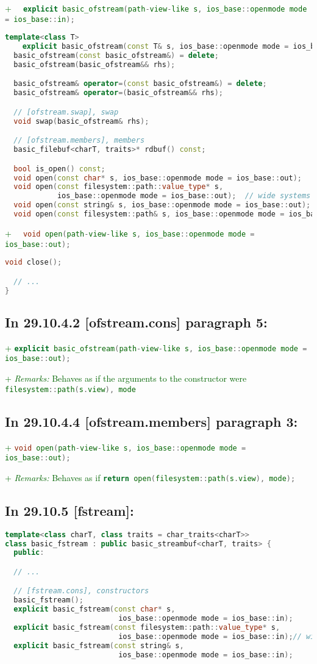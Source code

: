 \documentclass[11pt]{article}
\newcommand{\code}[2][cpp]{\lstinline[language=#1,basicstyle=\small\ttfamily]{#2}}
\newcommand{\desc}[1]{\textit{#1}}
\newcommand{\remarks}{\desc{Remarks: }}
\newcommand{\tsrefp}[3]{\subsection*{In #2 \textbf{[#1]} paragraph #3:}}
\newcommand{\tsref}[2]{\subsection*{In #2 \textbf{[#1]}:}}
\newcommand{\tsreplace}[3]{\textcolor{red}{\sout{#1}}#2\textcolor{darkgreen}{#3}}
\begin{document}
\tsreplace{}{}{+ \code{  explicit basic_ofstream(path-view-like s,
ios_base::openmode mode = ios_base::in);}}

\begin{lstlisting}[language=cpp]
  template<class T>
    explicit basic_ofstream(const T& s, ios_base::openmode mode = ios_base::in);
  basic_ofstream(const basic_ofstream&) = delete;
  basic_ofstream(basic_ofstream&& rhs);

  basic_ofstream& operator=(const basic_ofstream&) = delete;
  basic_ofstream& operator=(basic_ofstream&& rhs);

  // [ofstream.swap], swap
  void swap(basic_ofstream& rhs);

  // [ofstream.members], members
  basic_filebuf<charT, traits>* rdbuf() const;

  bool is_open() const;
  void open(const char* s, ios_base::openmode mode = ios_base::out);
  void open(const filesystem::path::value_type* s,
            ios_base::openmode mode = ios_base::out);  // wide systems only; see [fstream.syn]
  void open(const string& s, ios_base::openmode mode = ios_base::out);
  void open(const filesystem::path& s, ios_base::openmode mode = ios_base::out);
\end{lstlisting}

\tsreplace{}{}{+ \code{  void open(path-view-like s, ios_base::openmode mode = ios_base::out);}}

\begin{lstlisting}[language=cpp]
  void close();

  // ...
}
\end{lstlisting}


\tsrefp{ofstream.cons}{29.10.4.2}{5}

\tsreplace{}{}{+ \code{explicit basic_ofstream(path-view-like s,
ios_base::openmode mode = ios_base::out);}}

\tsreplace{}{}{+ \remarks Behaves as if the arguments to the constructor were \code{filesystem::path(s.view), mode}}

\tsrefp{ofstream.members}{29.10.4.4}{3}

\tsreplace{}{}{+ \code{void open(path-view-like s, ios_base::openmode mode = ios_base::out);}}

\tsreplace{}{}{+ \remarks Behaves as if \code{return open(filesystem::path(s.view), mode);}}


\tsref{fstream}{29.10.5}

\begin{lstlisting}[language=cpp]
template<class charT, class traits = char_traits<charT>>
class basic_fstream : public basic_streambuf<charT, traits> {
  public:

  // ...

  // [fstream.cons], constructors
  basic_fstream();
  explicit basic_fstream(const char* s,
                          ios_base::openmode mode = ios_base::in);
  explicit basic_fstream(const filesystem::path::value_type* s,
                          ios_base::openmode mode = ios_base::in);// wide systems only; see [fstream.syn]
  explicit basic_fstream(const string& s,
                          ios_base::openmode mode = ios_base::in);
\end{lstlisting}
\end{document}
